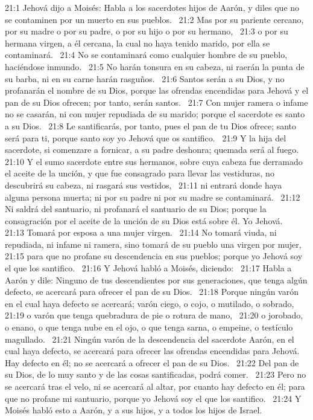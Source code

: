 21:1 Jehová dijo a Moisés: Habla a los sacerdotes hijos de Aarón, y diles que no se contaminen por un muerto en sus pueblos.  
21:2 Mas por su pariente cercano, por su madre o por su padre, o por su hijo o por su hermano,  
21:3 o por su hermana virgen, a él cercana, la cual no haya tenido marido, por ella se contaminará.  
21:4 No se contaminará como cualquier hombre de su pueblo, haciéndose inmundo.  
21:5 No harán tonsura en su cabeza, ni raerán la punta de su barba, ni en su carne harán rasguños.  
21:6 Santos serán a su Dios, y no profanarán el nombre de su Dios, porque las ofrendas encendidas para Jehová y el pan de su Dios ofrecen; por tanto, serán santos.  
21:7 Con mujer ramera o infame no se casarán, ni con mujer repudiada de su marido; porque el sacerdote es santo a su Dios.  
21:8 Le santificarás, por tanto, pues el pan de tu Dios ofrece; santo será para ti, porque santo soy yo Jehová que os santifico.  
21:9 Y la hija del sacerdote, si comenzare a fornicar, a su padre deshonra; quemada será al fuego.  
21:10 Y el sumo sacerdote entre sus hermanos, sobre cuya cabeza fue derramado el aceite de la unción, y que fue consagrado para llevar las vestiduras, no descubrirá su cabeza, ni rasgará sus vestidos,  
21:11 ni entrará donde haya alguna persona muerta; ni por su padre ni por su madre se contaminará.  
21:12 Ni saldrá del santuario, ni profanará el santuario de su Dios; porque la consagración por el aceite de la unción de su Dios está sobre él. Yo Jehová.  
21:13 Tomará por esposa a una mujer virgen.  
21:14 No tomará viuda, ni repudiada, ni infame ni ramera, sino tomará de su pueblo una virgen por mujer,  
21:15 para que no profane su descendencia en sus pueblos; porque yo Jehová soy el que los santifico.  
21:16 Y Jehová habló a Moisés, diciendo:  
21:17 Habla a Aarón y dile: Ninguno de tus descendientes por sus generaciones, que tenga algún defecto, se acercará para ofrecer el pan de su Dios.  
21:18 Porque ningún varón en el cual haya defecto se acercará; varón ciego, o cojo, o mutilado, o sobrado,  
21:19 o varón que tenga quebradura de pie o rotura de mano,  
21:20 o jorobado, o enano, o que tenga nube en el ojo, o que tenga sarna, o empeine, o testículo magullado.  
21:21 Ningún varón de la descendencia del sacerdote Aarón, en el cual haya defecto, se acercará para ofrecer las ofrendas encendidas para Jehová. Hay defecto en él; no se acercará a ofrecer el pan de su Dios.  
21:22 Del pan de su Dios, de lo muy santo y de las cosas santificadas, podrá comer.  
21:23 Pero no se acercará tras el velo, ni se acercará al altar, por cuanto hay defecto en él; para que no profane mi santuario, porque yo Jehová soy el que los santifico.  
21:24 Y Moisés habló esto a Aarón, y a sus hijos, y a todos los hijos de Israel.  
